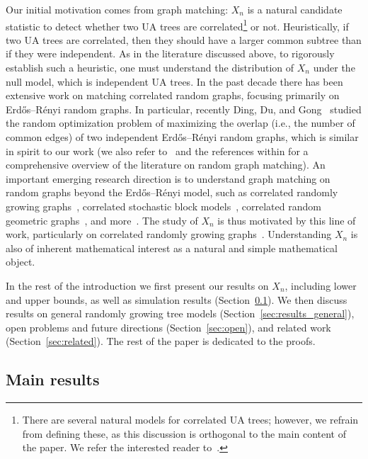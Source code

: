 \documentclass[11pt]{article}
\numberwithin{equation}{section}
\theoremstyle{definition}
\begin{document}
Our initial motivation comes from graph matching: $X_{n}$ is a natural candidate statistic to detect whether two UA trees are correlated\footnote{There are several natural models for correlated UA trees; however, we refrain from defining these, as this discussion is orthogonal to the main content of the paper. We refer the interested reader to~\cite{RS22AAP,BRRS26}.} or not. Heuristically, if two UA trees are correlated, then they should have a larger common subtree than if they were independent. 
As in the literature discussed above, to rigorously establish such a heuristic, one must understand the distribution of $X_{n}$ under the null model, which is independent UA trees. 
In the past decade there has been extensive work on matching correlated random graphs, focusing primarily on Erd\H{o}s--R\'enyi random graphs. 
In particular, recently Ding, Du, and Gong~\cite{ding2024polynomial} studied the random optimization problem of maximizing the overlap (i.e., the number of common edges) of two independent Erd\H{o}s--R\'enyi random graphs, which is similar in spirit to our work (we also refer to~\cite{ding2024polynomial} and the references within for a comprehensive overview of the literature on random graph matching). 
An important emerging research direction is to understand graph matching on random graphs beyond the Erd\H{o}s--R\'enyi model, such as correlated randomly growing graphs~\cite{RS22AAP,BRRS26}, correlated stochastic block models~\cite{RS21SBM,GRS22}, correlated random geometric graphs~\cite{wang2022geometric}, and more~\cite{RS23,ding2025efficiently}. The study of $X_{n}$ is thus motivated by this line of work, particularly on correlated randomly growing graphs~\cite{RS22AAP,BRRS26}. 
Understanding $X_{n}$ is also of inherent mathematical interest as a natural and simple mathematical object. 


In the rest of the introduction we first present our results on $X_{n}$, including lower and upper bounds, as well as simulation results (Section~\ref{sec:results_main}). 
We then discuss results on general randomly growing tree models (Section~\ref{sec:results_general}), open problems and future directions (Section~\ref{sec:open}), and related work (Section~\ref{sec:related}). The rest of the paper is dedicated to the proofs. 


\subsection{Main results} \label{sec:results_main}
\end{document}
